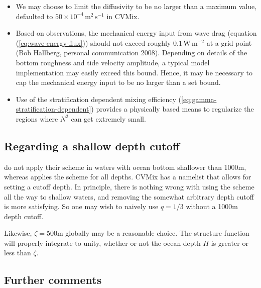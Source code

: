 \begin{itemize}

\item We may choose to limit the diffusivity to be no larger than a
  maximum value, defaulted to $50 \times 10^{-4} \, \mbox{m}^{2} \,
  \mbox{s}^{-1}$ in CVMix.

\item Based on observations, the mechanical energy input from wave
  drag (equation (\ref{eq:wave-energy-flux})) should not exceed
  roughly $0.1 \, \mbox{W} \, \mbox{m}^{-2}$ at a grid point (Bob
  Hallberg, personal communication 2008).  Depending on details of the
  bottom roughness and tide velocity amplitude, a typical model
  implementation may easily exceed this bound.  Hence, it may be
  necessary to cap the mechanical energy input to be no larger than a
  set bound.

\item Use of the stratification dependent mixing efficiency
  (\ref{eq:gamma-stratification-dependent}) provides a physically
  based means to regularize the regions where $N^{2}$ can get
  extremely small. 

\end{itemize}


\subsection{Regarding a shallow depth cutoff}

\cite{Simmonsetal2004} do not apply their scheme in waters with ocean
bottom shallower than 1000m, whereas \cite{Jayne2009} applies the
scheme for all depths.  CVMix has a namelist that allows for setting
a cutoff depth.  In principle, there is nothing wrong with using the
\cite{Simmonsetal2004} scheme all the way to shallow waters, and
removing the somewhat arbitrary depth cutoff is more satisfying.  So
one may wish to naively use $q = 1/3$ without a 1000m depth cutoff.

Likewise, $\zeta = 500$m globally may be a reasonable choice. The
structure function will properly integrate to unity, whether or not
the ocean depth $H$ is greater or less than $\zeta$.

\subsection{Further comments} 

